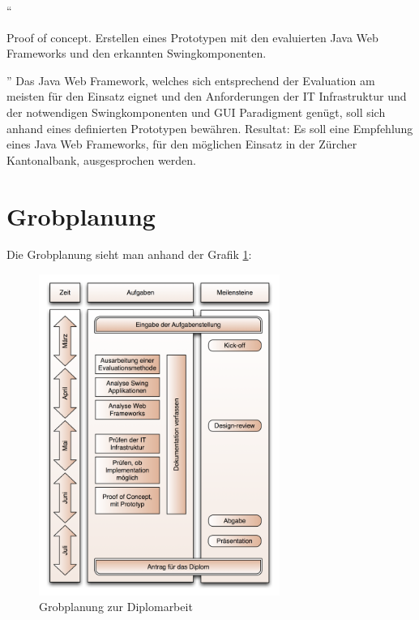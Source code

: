   ``\begin{itshape}Proof of concept. Erstellen eines Prototypen mit den
  evaluierten Java Web Frameworks und den erkannten
  Swingkomponenten.\end{itshape}''
  \newline
  \newline
  \noindent
  Das Java Web Framework, welches sich entsprechend der Evaluation am meisten
  für den Einsatz eignet und den Anforderungen der IT Infrastruktur und der
  notwendigen Swingkomponenten und GUI Paradigment genügt, soll sich anhand
  eines definierten Prototypen bewähren.
  \newline
  \newline
  \noindent
  Resultat: Es soll eine Empfehlung eines Java Web Frameworks, für den
  möglichen Einsatz in der Zürcher Kantonalbank, ausgesprochen werden.
  
  \section{Grobplanung}
  
  Die Grobplanung sieht man anhand der Grafik \ref{grobplanung}:
  
  \begin{figure}[h]
    \begin{center}
      \includegraphics[width=0.7\textwidth]{./image/grobplanung.png}
      \caption{Grobplanung zur Diplomarbeit}
      \label{grobplanung}
    \end{center}
  \end{figure}
  
